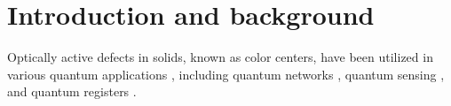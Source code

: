 \documentclass[%
 reprint,
superscriptaddress,
 amsmath,amssymb,
 aps,
]{revtex4-2}
\begin{document}
\maketitle
\section{Introduction and background}
Optically active defects in solids, known as color centers, have been utilized in various quantum applications \cite{awschalom2018quantum}, including quantum networks \cite{pompili2021realization}, quantum sensing \cite{degen2017quantum, meinel2023high}, and quantum registers \cite{bradley2019ten, vorobyov2021quantum, hesselmeier2023measuring, hesselmeier2024high, reiner2024high}. 
\end{document}
